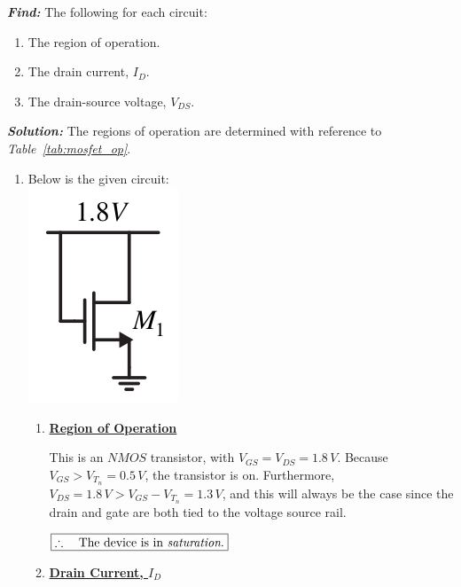 \documentclass[12pt, fleqn]{article}
\begin{document}
\noindent
\textbf{\emph{Find: }} The following for each circuit:

\begin{enumerate}[label=(\roman*)]
    \item{The region of operation.}
    \item{The drain current, $I_D$.}
    \item{The drain-source voltage, $V_{DS}$.}
\end{enumerate}

\newpage\noindent
\textbf{\emph{Solution: }}The regions of operation are determined with reference to \textit{Table~\ref{tab:mosfet_op}}.

\begin{enumerate}[label=(\alph*)]
    \item
    {
    Below is the given circuit:\\
    \includegraphics[scale=0.55, center]{p1a.png}\\
    \begin{enumerate}[label=(\roman*)]
        \item
        {
        \underline{\textbf{Region of Operation}}
        
        \vspace{0.15cm}
        This is an $NMOS$ transistor, with $V_{GS} = V_{DS} = 1.8\,V$.  Because $V_{GS} > V_{T_n} = 0.5\,V$, the transistor is on.  Furthermore, $V_{DS} = 1.8\,V > V_{GS} - V_{T_n} = 1.3\,V$, and this will always be the case since the drain and gate are both tied to the voltage source rail.
        
        \vspace{0.25cm}
        $\boxed{\therefore\quad{\text{The device is in \textit{saturation}.}}}$
        }
        \vspace{0.25cm}
        \item
        {
        \underline{\textbf{Drain Current, $I_D$}}
        
}
\end{enumerate}}
\end{enumerate}
\end{document}

